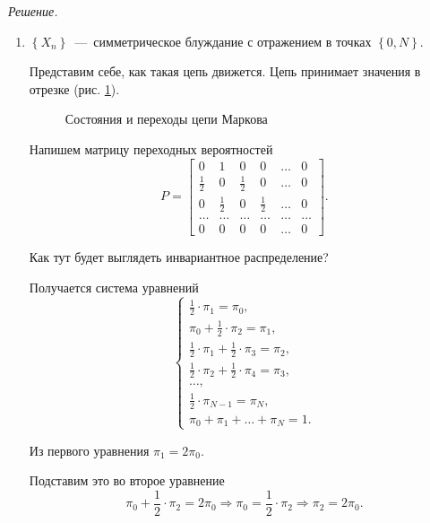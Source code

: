 \textit{Решение.}
\begin{enumerate}[label=\alph*)]
  \item $ \left\{ X_n \right\} $~---~симметрическое блуждание с отражением в точках
  $ \left\{ 0, N \right\} $.

  Представим себе, как такая цепь движется.
  Цепь принимает значения в отрезке (рис. \ref{fig:1513}).

  \begin{figure}[h]
    \centering
    
    \caption{Состояния и переходы цепи Маркова}
    \label{fig:1513}
  \end{figure}

  Напишем матрицу переходных вероятностей
  \begin{equation*}
    P =
    \begin{bmatrix}
      0 & 1 & 0 & 0 & \dotsc & 0 \\
      \frac{1}{2} & 0 & \frac{1}{2} & 0 & \dotsc & 0 \\
      0 & \frac{1}{2} & 0 & \frac{1}{2} & \dotsc & 0 \\
      \dotsc & \dotsc & \dotsc & \dotsc & \dotsc & \dotsc \\
      0 & 0 & 0 & 0 & \dotsc & 0
    \end{bmatrix}.
  \end{equation*}

  Как тут будет выглядеть инвариантное распределение?

  Получается система уравнений
  \begin{equation*}
    \begin{cases}
      \frac{1}{2} \cdot \pi_1 = \pi_0, \\
      \pi_0 + \frac{1}{2} \cdot \pi_2 = \pi_1, \\
      \frac{1}{2} \cdot \pi_1 + \frac{1}{2} \cdot \pi_3 = \pi_2, \\
      \frac{1}{2} \cdot \pi_2 + \frac{1}{2} \cdot \pi_4 = \pi_3, \\
      \dotsc, \\
      \frac{1}{2} \cdot \pi_{N - 1} = \pi_N, \\
      \pi_0 + \pi_1 + \dotsc + \pi_N = 1.
    \end{cases}
  \end{equation*}

  Из первого уравнения $ \pi_1 = 2 \pi_0$.

  Подставим это во второе уравнение
  \begin{equation*}
    \pi_0 + \frac{1}{2} \cdot \pi_2 = 2 \pi_0 \Rightarrow
    \pi_0 = \frac{1}{2} \cdot \pi_2 \Rightarrow
    \pi_2 = 2 \pi_0.
  \end{equation*}


\end{enumerate}

